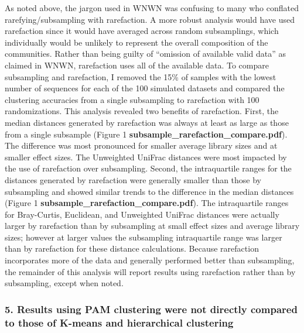 \documentclass[
]{article}
\begin{document}
As noted above, the jargon used in WNWN was confusing to many who
conflated rarefying/subsampling with rarefaction. A more robust analysis
would have used rarefaction since it would have averaged across random
subsamplings, which individually would be unlikely to represent the
overall composition of the communities. Rather than being guilty of
``omission of available valid data'' as claimed in WNWN, rarefaction
uses all of the available data. To compare subsampling and rarefaction,
I removed the 15\% of samples with the lowest number of sequences for
each of the 100 simulated datasets and compared the clustering
accuracies from a single subsampling to rarefaction with 100
randomizations. This analysis revealed two benefits of rarefaction.
First, the median distances generated by rarefaction was always at least
as large as those from a single subsample (Figure 1
\textbf{subsample\_rarefaction\_compare.pdf}). The difference was most
pronounced for smaller average library sizes and at smaller effect
sizes. The Unweighted UniFrac distances were most impacted by the use of
rarefaction over subsampling. Second, the intraquartile ranges for the
distances generated by rarefaction were generally smaller than those by
subsampling and showed similar trends to the difference in the median
distances (Figure 1 \textbf{subsample\_rarefaction\_compare.pdf}). The
intraquartile ranges for Bray-Curtis, Euclidean, and Unweighted UniFrac
distances were actually larger by rarefaction than by subsampling at
small effect sizes and average library sizes; however at larger values
the subsampling intraquartile range was larger than by rarefaction for
these distance calculations. Because rarefaction incorporates more of
the data and generally performed better than subsampling, the remainder
of this analysis will report results using rarefaction rather than by
subsampling, except when noted.

\hypertarget{results-using-pam-clustering-were-not-directly-compared-to-those-of-k-means-and-hierarchical-clustering}{%
\subsubsection{5. Results using PAM clustering were not directly
compared to those of K-means and hierarchical
clustering}\label{results-using-pam-clustering-were-not-directly-compared-to-those-of-k-means-and-hierarchical-clustering}}
\end{document}
